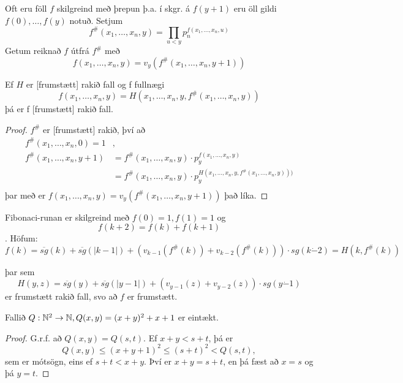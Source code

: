 \documentclass[12pt]{book}
\newcommand{\xxn}{x_1, \dotsc, x_n}
\newcommand{\dda}{\dot{-}}
\begin{document}
Oft eru föll $f$ skilgreind með þrepun þ.a.
í skgr. á $f(y+1)$ eru öll gildi $f(0), \dotsc, f(y)$
notuð. Setjum
\[ f^{\#}(\xxn,y) = \prod_{u < y}p_n^{f(\xxn,u)} \]
Getum reiknað $f$ útfrá $f^{\#}$ með
\[ f(\xxn,y) = v_y (f^{\#}(\xxn,y+1)) \]

\begin{setn}
  Ef $H$ er [frumstætt] rakið fall og f fullnægi
  \[ f(\xxn, y) = H(\xxn,y, f^{\#}(\xxn,y))\]
  þá er f [frumstætt] rakið fall.
\end{setn}

\begin{proof}
  $f^{\#}$ er [frumstætt] rakið, því að
  \begin{align*}
    f^{\#}(\xxn,0) = 1& ,\\
    f^{\#}(\xxn,y+1) &= f^{\#}(\xxn,y) \cdot p_y^{f(\xxn,y)}\\
    &= f^{\#}(\xxn,y) \cdot p_y^{H(\xxn,y,f^{\#}(\xxn,y)))}\\
  \end{align*}
  þar með er $f(\xxn,y) = v_y(f^{\#}(\xxn,y+1))$ það líka.
\end{proof}

\begin{daemi}
  Fibonaci-runan er skilgreind með 
  $f(0) = 1, f(1) = 1$ og \[f(k+2) = f(k)+ f(k+1)\].
  Höfum:
  \[f(k) = \overline{sg}(k) + \overline{sg}(|k-1|) + (v_{k-1}(f^{\#}(k))+v_{k-2}(f^{\#}(k))) \cdot sg(k \dda 2)  = H(k, f^{\#} (k)) \]

  þar sem  
  \[ H(y,z) =  \overline{sg}(y) + \overline{sg}(|y-1|) + (v_{y-1}(z) + v_{y-2}(z))\cdot sg(y \dda 1)\]
  er frumstætt rakið fall, svo að $f$ er frumstætt.
\end{daemi}

\begin{setn}[Hjálparsetning]
  Fallið $Q: \mathbb{N}^2 \to \mathbb{N}, Q(x,y) = (x+y)^2 +x + 1$ er eintækt.
  \begin{proof}
    G.r.f. að $Q(x,y) = Q(s,t)$. Ef $x+y < s+t$, þá er
     \[ Q(x,y) \leq (x+y +1)^2 \leq (s+t)^2 < Q(s,t),\]
     sem er mótsögn, eins ef $s+t < x+y$. Því er $x+y = s+t$,
     en þá fæst að $x = s$ og þá $y = t$.
  \end{proof}
\end{setn}
\end{document}

